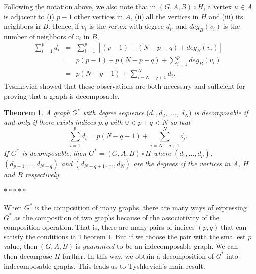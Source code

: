 \documentclass[11pt]{article}
\newtheorem{theorem}[df]{Theorem}
\begin{document}
Following the  notation above, we also note that  in $(G, A, B) \circ H$, a vertex $u \in A$  is adjacent  to (i) $p-1$ other vertices in $A$, (ii) all the vertices in $H$ and (iii) its neighbors in $B$.  Hence, if $v_i$ is the vertex with degree $d_i$, and $deg_B(v_i)$ is the number of neighbors of $v_i$ in $B$, 
\begin{eqnarray*}
  \sum_{i=1}^p d_i & = &  \sum_{i=1}^p \left[(p-1) + (N-p-q) + deg_B(v_i) \right] \\
                               & = & p(p-1) + p(N-p-q) + \sum_{i=1}^p deg_B(v_i)  \\
                               & = &  p(N-q-1) +  \sum_{i = N-q+1}^N d_i. 
\end{eqnarray*}
Tyshkevich showed that these observations are both necessary and sufficient for proving that a graph is decomposable.


 
 \begin{theorem} {\bf \cite{Ty00}}
   A graph $G^*$  with degree sequence $(d_1, d_2,$ $\hdots$, $d_N)$  is decomposable if and only if  there exists indices $p, q$ with $0< p + q < N$ so that $$ \sum_{i=1}^p d_i = p(N-q-1) + \sum_{i = N-q+1}^N d_i.$$
 If $G^*$ is decomposable, then  $G^* = (G, A, B) \circ H$ where   $(d_1, \hdots, d_p)$, $(d_{p+1}, \hdots, d_{N-q})$ and $(d_{N-q+1}, \hdots, d_N)$ are the degrees of the vertices in $A$, $H$ and $B$ respectively.   
 \label{mainthm1}
 \end{theorem}


\medskip	
\bigskip %
\centerline{$*  *  *  * *$}
\bigskip %
\medskip


When $G^*$ is the composition of many graphs,  there are many ways of expressing $G^*$ as the composition of two graphs because of the associativity of the composition operation.  That is, there are many pairs of indices $(p,q)$  that can satisfy the conditions in Theorem \ref{mainthm1}.  But if we choose  the pair with the smallest $p$ value, then $(G,A,B)$ is {\it guaranteed} to be an { indecomposable} graph.  We can then decompose $H$ further.  In this way, we obtain a decomposition of $G^*$ into indecomposable graphs.   This leads us to Tyshkevich's main result.
\end{document}
